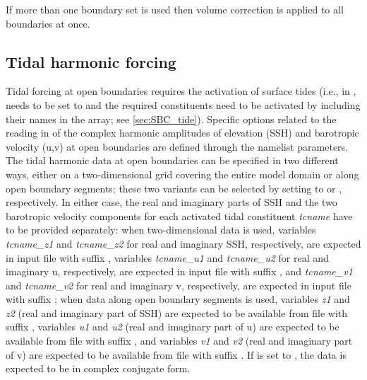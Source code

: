 \documentclass[../main/NEMO_manual]{subfiles}
\begin{document}
If more than one boundary set is used then volume correction is
applied to all boundaries at once.

\subsection{Tidal harmonic forcing}
\label{subsec:BDY_tides}



Tidal forcing at open boundaries requires the activation of surface
tides (i.e., in ,  needs to be set to
 and the required constituents need to be activated by
including their names in the  array; see
\autoref{sec:SBC_tide}). Specific options related to the reading in of
the complex harmonic amplitudes of elevation (SSH) and barotropic
velocity (u,v) at open boundaries are defined through the
 namelist parameters.\\

The tidal harmonic data at open boundaries can be specified in two
different ways, either on a two-dimensional grid covering the entire
model domain or along open boundary segments; these two variants can
be selected by setting  to  or
, respectively. In either case, the real and
imaginary parts of SSH and the two barotropic velocity components for
each activated tidal constituent \textit{tcname} have to be provided
separately: when two-dimensional data is used, variables
\textit{tcname\_z1} and \textit{tcname\_z2} for real and imaginary SSH,
respectively, are expected in input file  with suffix
, variables \textit{tcname\_u1} and
\textit{tcname\_u2} for real and imaginary u, respectively, are
expected in input file  with suffix , and
\textit{tcname\_v1} and \textit{tcname\_v2} for real and imaginary v,
respectively, are expected in input file  with suffix
; when data along open boundary segments is used,
variables \textit{z1} and \textit{z2} (real and imaginary part of SSH)
are expected to be available from file  with suffix
, variables \textit{u1} and \textit{u2} (real
and imaginary part of u) are expected to be available from file
 with suffix , and variables
\textit{v1} and \textit{v2} (real and imaginary part of v) are
expected to be available from file  with suffix
. If  is set to
, the data is expected to be in complex conjugate
form.
\end{document}
